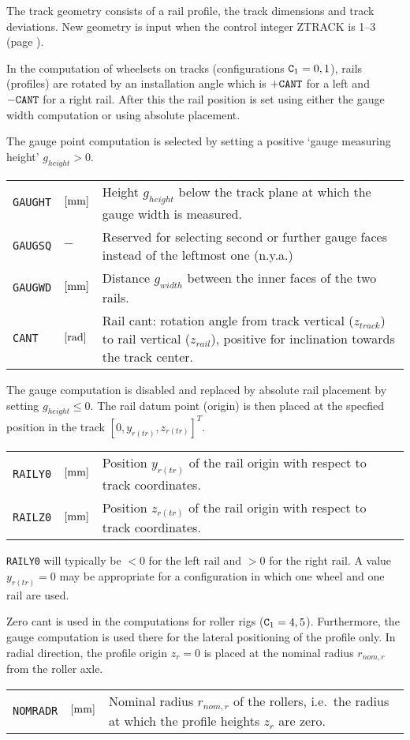 \documentclass[12pt]{report}
\newenvironment{inputvars}{\vspace{0.4\baselineskip}%

\begin{tabular}{>{\raggedright}p{22mm}p{19mm}p{113mm}}}{
\end{tabular}

}
\newcommand{\inpvar}[3]{{\small\tt #1} & $#2$ & #3 \\[1ex]}
\begin{document}
The track geometry consists of a rail profile, the track dimensions
and track deviations. New geometry is input when the control integer
ZTRACK is 1--3 (page \pageref{z1-digit}).

In the computation of wheelsets on tracks (configurations ${\tt C}_1=0,
1$), rails (profiles) are rotated by an installation angle which is $+{\tt
CANT}$ for a left and $-{\tt CANT}$ for a right rail. 
After this the rail position is set using either the gauge width
computation or using absolute placement.

The gauge point computation is selected by setting a positive 
`gauge measuring height' $g_{height}>0$.
\begin{inputvars}
\inpvar{GAUGHT}{\bunit{mm}}{Height $g_{height}$ below the track plane at which
        the gauge width is measured.}
\inpvar{GAUGSQ}{-}{Reserved for selecting second or further gauge faces
        instead of the leftmost one (n.y.a.)}
\inpvar{GAUGWD}{\bunit{mm}}{Distance $g_{width}$ between the inner faces of the
        two rails.}
\inpvar{CANT}{\bunit{rad}}{Rail cant: rotation angle from track vertical
        ($z_{track}$) to rail vertical ($z_{rail}$), positive for
        inclination towards the track center.}
\end{inputvars}
The gauge computation is disabled and replaced by absolute rail placement
by setting $g_{height}\le 0$. The rail datum point (origin) is then placed
at the specfied position in the track $[0, y_{r(tr)}, z_{r(tr)}]^T$. 
\begin{inputvars}
\inpvar{RAILY0}{\bunit{mm}}{Position $y_{r(tr)}$ of the rail origin with
        respect to track coordinates.}
\inpvar{RAILZ0}{\bunit{mm}}{Position $z_{r(tr)}$ of the rail origin with
        respect to track coordinates.}
\end{inputvars}
{\tt RAILY0} will typically be $<0$ for the left rail and $>0$ for
the right rail. A value $y_{r(tr)}=0$ may be appropriate for a
configuration in which one wheel and one rail are used.

Zero cant is used in the computations for roller rigs (${\tt C}_1=4,5$).
Furthermore, the gauge computation is used there for the lateral
positioning of the profile only. In radial direction, the profile origin
$z_r=0$ is placed at the nominal radius $r_{nom,r}$ from the roller axle.
\begin{inputvars}
\inpvar{NOMRADR}{\bunit{mm}}{Nominal radius $r_{nom,r}$ of the rollers, i.e.\ the
        radius at which the profile heights $z_r$ are zero.}
\end{inputvars}
\end{document}
